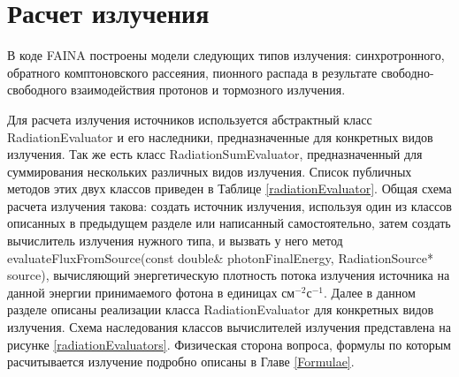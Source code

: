 \chapter{Расчет излучения}\label{evaluation}
В коде FAINA построены модели следующих типов излучения: синхротронного, обратного комптоновского рассеяния, пионного распада в результате свободно-свободного взаимодействия протонов и тормозного излучения.

Для расчета излучения источников используется абстрактный класс RadiationEvaluator и его наследники, предназначенные для конкретных видов излучения. Так же есть класс RadiationSumEvaluator, предназначенный для суммирования нескольких различных видов излучения. Список публичных методов этих двух классов приведен в Таблице \ref{radiationEvaluator}. Общая схема расчета излучения такова: создать источник излучения, используя один из классов описанных в предыдущем разделе или написанный самостоятельно, затем создать вычислитель излучения нужного типа, и вызвать у него метод evaluateFluxFromSource(const double\& photonFinalEnergy, RadiationSource* source), вычисляющий энергетическую плотность потока излучения источника на данной энергии принимаемого фотона в единицах  $\text{см}^{-2} \text{с}^{-1}$. Далее в данном разделе описаны реализации класса RadiationEvaluator для конкретных видов излучения. Схема наследования классов вычислителей излучения представлена на рисунке \ref{radiationEvaluators}. Физическая сторона вопроса, формулы по которым расчитывается излучение подробно описаны в Главе \ref{Formulae}.

